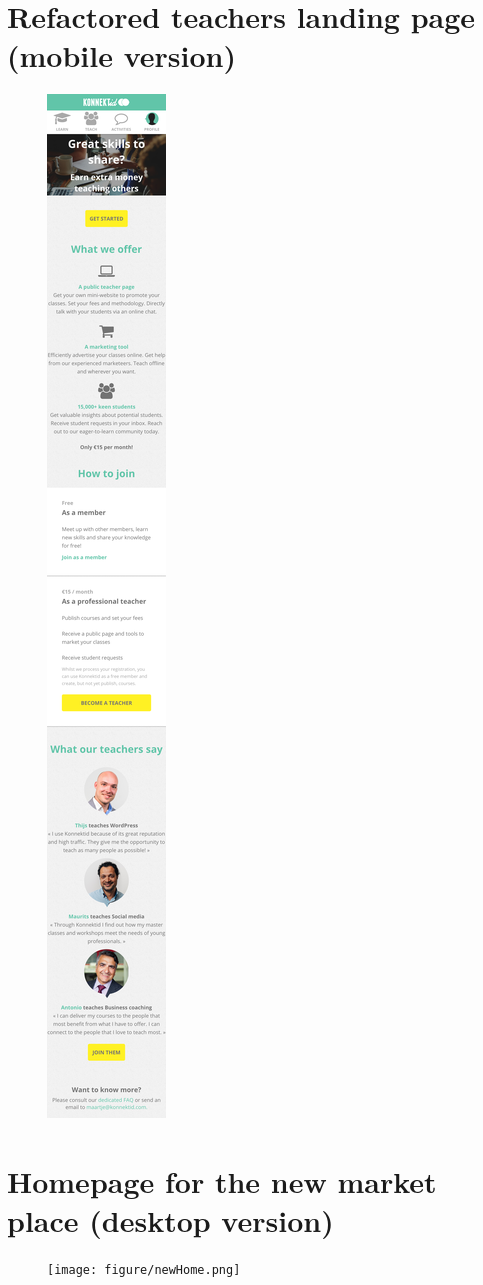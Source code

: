 \newpage

\section{Refactored teachers landing page (mobile version)}
\label{sec:phoneTeachersPage}

\begin{figure}[H]
    \centering
    \includegraphics[scale=0.1]{figure/phoneTeachersPage.png}
\end{figure}

\newpage

\section{Homepage for the new market place (desktop version)}
\label{sec:newHome}

\begin{figure}[H]
    \centering
    \texttt{[image: figure/newHome.png]}
\end{figure}
